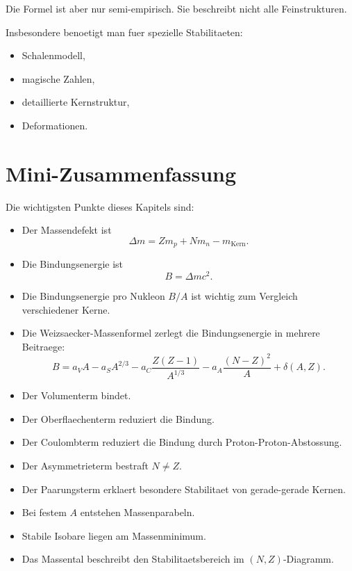 \begin{notebox}
Die Formel ist aber nur semi-empirisch.
Sie beschreibt nicht alle Feinstrukturen.

Insbesondere benoetigt man fuer spezielle Stabilitaeten:
\begin{itemize}
    \item Schalenmodell,
    \item magische Zahlen,
    \item detaillierte Kernstruktur,
    \item Deformationen.
\end{itemize}
\end{notebox}

\section{Mini-Zusammenfassung}

\begin{notebox}
Die wichtigsten Punkte dieses Kapitels sind:
\begin{itemize}
    \item Der Massendefekt ist
    \[
        \Delta m = Zm_p + Nm_n - m_{\mathrm{Kern}}.
    \]
    \item Die Bindungsenergie ist
    \[
        B=\Delta mc^2.
    \]
    \item Die Bindungsenergie pro Nukleon $B/A$ ist wichtig zum Vergleich verschiedener Kerne.
    \item Die Weizsaecker-Massenformel zerlegt die Bindungsenergie in mehrere Beitraege:
    \[
        B
        =
        a_V A
        - a_S A^{2/3}
        - a_C \frac{Z(Z-1)}{A^{1/3}}
        - a_A \frac{(N-Z)^2}{A}
        + \delta(A,Z).
    \]
    \item Der Volumenterm bindet.
    \item Der Oberflaechenterm reduziert die Bindung.
    \item Der Coulombterm reduziert die Bindung durch Proton-Proton-Abstossung.
    \item Der Asymmetrieterm bestraft $N\neq Z$.
    \item Der Paarungsterm erklaert besondere Stabilitaet von gerade-gerade Kernen.
    \item Bei festem $A$ entstehen Massenparabeln.
    \item Stabile Isobare liegen am Massenminimum.
    \item Das Massental beschreibt den Stabilitaetsbereich im $(N,Z)$-Diagramm.
\end{itemize}
\end{notebox}

